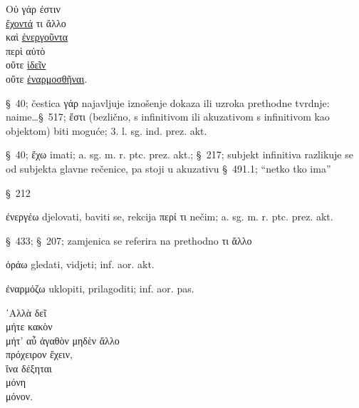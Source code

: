 

{\large
\begin{greek}
\noindent Οὐ γάρ ἐστιν \\
\tabto{2em} \underline{ἔχοντά} τι ἄλλο \\
\tabto{2em} καὶ \underline{ἐνεργοῦντα} \\
\tabto{2em} \tabto{2em} περὶ αὐτὸ \\
\tabto{2em} οὔτε \underline{ἰδεῖν}\\
\tabto{2em} οὔτε \underline{ἐναρμοσθῆναι}.\\

\end{greek}
}

\begin{description}[noitemsep]
\item[γάρ ἐστιν] §~40; čestica γάρ najavljuje iznošenje dokaza ili uzroka prethodne tvrdnje: naime\dots §~517; ἔστι (bezlično, s infinitivom ili akuzativom s infinitivom kao objektom) biti moguće; 3. l. sg. ind. prez. akt.
\item[ἔχοντά τι] §~40; ἔχω imati; a. sg. m. r. ptc. prez. akt.; §~217; subjekt infinitiva razlikuje se od subjekta glavne rečenice, pa stoji u akuzativu §~491.1; ``netko tko ima''
\item[ἄλλο] §~212
\item[ἐνεργοῦντα] ἐνεργέω djelovati, baviti se, rekcija περί τι nečim; a. sg. m. r. ptc. prez. akt.
\item[περὶ αὐτὸ] §~433; §~207; zamjenica se referira na prethodno τι ἄλλο
\item[ἰδεῖν] ὁράω gledati, vidjeti; inf. aor. akt.
\item[ἐναρμοσθῆναι] ἐναρμόζω uklopiti, prilagoditi; inf. aor. pas.

\end{description}



{\large
\begin{greek}
\noindent ᾿Αλλὰ δεῖ \\
\tabto{2em} μήτε κακὸν \\
\tabto{2em} μήτ' αὖ ἀγαθὸν μηδὲν ἄλλο \\
\tabto{2em} πρόχειρον ἔχειν, \\
\tabto{4em} ἵνα δέξηται \\
\tabto{6em} μόνη \\
\tabto{6em} μόνον.\\

\end{greek}
}

